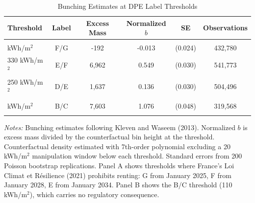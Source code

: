 \begin{table}[htbp]
\centering
\caption{Bunching Estimates at DPE Label Thresholds}
\label{tab:bunching}
\begin{tabular}{lccccc}
\hline\hline
Threshold & Label & Excess Mass & Normalized $b$ & SE & Observations \\
\hline
\addlinespace
\multicolumn{6}{l}{\textit{Panel A: Regulatory Thresholds}} \\
\addlinespace
420 kWh/m$^2$ & F/G & -192 & -0.013 & (0.024) & 432,780 \\
330 kWh/m$^2$ & E/F & 6,962 & 0.549 & (0.030) & 541,773 \\
250 kWh/m$^2$ & D/E & 1,637 & 0.136 & (0.030) & 504,496 \\
\addlinespace
\multicolumn{6}{l}{\textit{Panel B: Placebo Threshold}} \\
\addlinespace
110 kWh/m$^2$ & B/C & 7,603 & 1.076 & (0.048) & 319,568 \\
\addlinespace
\hline\hline
\end{tabular}
\begin{tablenotes}
\small
\item \textit{Notes:} Bunching estimates following Kleven and Waseem (2013). Normalized $b$ is excess mass divided by the counterfactual bin height at the threshold. Counterfactual density estimated with 7th-order polynomial excluding a 20 kWh/m$^2$ manipulation window below each threshold. Standard errors from 200 Poisson bootstrap replications. Panel A shows thresholds where France's Loi Climat et R\'{e}silience (2021) prohibits renting: G from January 2025, F from January 2028, E from January 2034. Panel B shows the B/C threshold (110 kWh/m$^2$), which carries no regulatory consequence.
\end{tablenotes}
\end{table}
